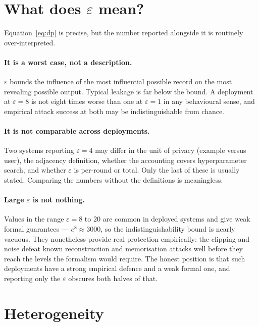 \documentclass[11pt,a4paper]{article}
\begin{document}
\section{What does $\varepsilon$ mean?}
\label{sec:epsilon}

Equation~\ref{eq:dp} is precise, but the number reported alongside it is
routinely over-interpreted.

\paragraph{It is a worst case, not a description.}
$\varepsilon$ bounds the influence of the most influential possible record on
the most revealing possible output. Typical leakage is far below the bound. A
deployment at $\varepsilon = 8$ is not eight times worse than one at
$\varepsilon = 1$ in any behavioural sense, and empirical attack success at
both may be indistinguishable from chance.

\paragraph{It is not comparable across deployments.}
Two systems reporting $\varepsilon = 4$ may differ in the unit of privacy
(example versus user), the adjacency definition, whether the accounting covers
hyperparameter search, and whether $\varepsilon$ is per-round or total. Only
the last of these is usually stated. Comparing the numbers without the
definitions is meaningless.

\paragraph{Large $\varepsilon$ is not nothing.}
Values in the range $\varepsilon = 8$ to $20$ are common in deployed systems
and give weak formal guarantees --- $e^{8} \approx 3000$, so the
indistinguishability bound is nearly vacuous. They nonetheless provide real
protection empirically: the clipping and noise defeat known reconstruction and
memorisation attacks well before they reach the levels the formalism would
require. The honest position is that such deployments have a strong empirical
defence and a weak formal one, and reporting only the $\varepsilon$ obscures
both halves of that.

\section{Heterogeneity}
\label{sec:heterogeneity}
\end{document}
